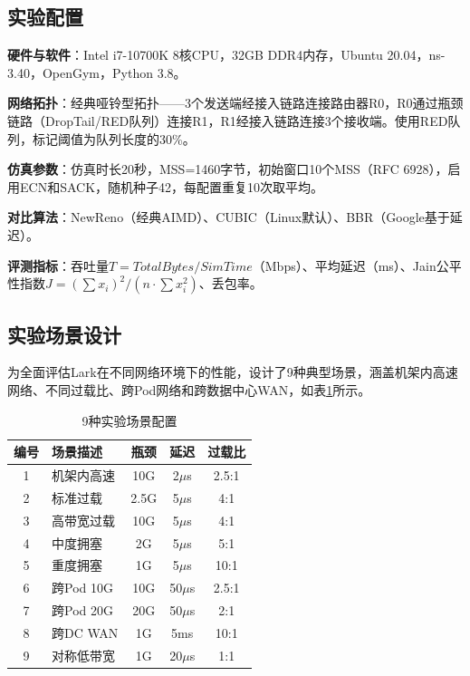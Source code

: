 \documentclass[10pt,twocolumn]{article}
\begin{document}
\subsection{实验配置}

\textbf{硬件与软件}：Intel i7-10700K 8核CPU，32GB DDR4内存，Ubuntu 20.04，ns-3.40\cite{ns3}，OpenGym\cite{opengym}，Python 3.8。

\textbf{网络拓扑}：经典哑铃型拓扑——3个发送端经接入链路连接路由器R0，R0通过瓶颈链路（DropTail/RED队列）连接R1，R1经接入链路连接3个接收端。使用RED队列，标记阈值为队列长度的30\%。

\textbf{仿真参数}：仿真时长20秒，MSS=1460字节，初始窗口10个MSS（RFC 6928），启用ECN和SACK，随机种子42，每配置重复10次取平均。

\textbf{对比算法}：NewReno\cite{newreno}（经典AIMD）、CUBIC\cite{cubic}（Linux默认）、BBR\cite{bbr}（Google基于延迟）。

\textbf{评测指标}：吞吐量$T = TotalBytes / SimTime$（Mbps）、平均延迟（ms）、Jain公平性指数$J = (\sum x_i)^2 / (n \cdot \sum x_i^2)$\cite{fairness}、丢包率。

\subsection{实验场景设计}

为全面评估Lark在不同网络环境下的性能，设计了9种典型场景，涵盖机架内高速网络、不同过载比、跨Pod网络和跨数据中心WAN，如表\ref{tab:scenarios}所示。

\begin{table}[htbp]
\centering
\caption{9种实验场景配置}
\label{tab:scenarios}
\small
\begin{tabular}{clccc}
\toprule
\textbf{编号} & \textbf{场景描述} & \textbf{瓶颈} & \textbf{延迟} & \textbf{过载比} \\
\midrule
1 & 机架内高速 & 10G & 2$\mu$s & 2.5:1 \\
2 & 标准过载 & 2.5G & 5$\mu$s & 4:1 \\
3 & 高带宽过载 & 10G & 5$\mu$s & 4:1 \\
4 & 中度拥塞 & 2G & 5$\mu$s & 5:1 \\
5 & 重度拥塞 & 1G & 5$\mu$s & 10:1 \\
6 & 跨Pod 10G & 10G & 50$\mu$s & 2.5:1 \\
7 & 跨Pod 20G & 20G & 50$\mu$s & 2:1 \\
8 & 跨DC WAN & 1G & 5ms & 10:1 \\
9 & 对称低带宽 & 1G & 20$\mu$s & 1:1 \\
\bottomrule
\end{tabular}
\end{table}
\end{document}
